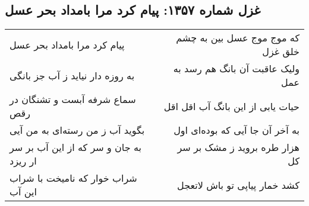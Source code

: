 \begin{center}
\section*{غزل شماره ۱۳۵۷: پیام کرد مرا بامداد بحر عسل}
\label{sec:1357}
\begin{longtable}{l p{0.5cm} r}
پیام کرد مرا بامداد بحر عسل
&&
که موج موج عسل بین به چشم خلق غزل
\\
به روزه دار نیاید ز آب جز بانگی
&&
ولیک عاقبت آن بانگ هم رسد به عمل
\\
سماع شرفه آبست و تشنگان در رقص
&&
حیات یابی از این بانگ آب اقل اقل
\\
بگوید آب ز من رسته‌ای به من آیی
&&
به آخر آن جا آیی که بوده‌ای اول
\\
به جان و سر که از این آب بر سر ار ریزد
&&
هزار طره بروید ز مشک بر سر کل
\\
شراب خوار که نامیخت با شراب این آب
&&
کشد خمار پیاپی تو باش لاتعجل
\\
\end{longtable}
\end{center}

